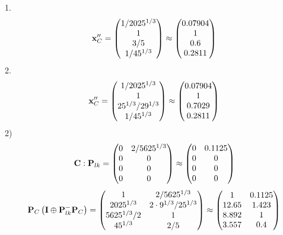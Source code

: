 \documentclass[10pt,a4paper]{article}
\begin{document}
	1.
	\[
		\bold{x}''_{C} = 
		\begin{pmatrix}
			{1} / {{2025^ {1 / 3}}} \\
			{1}{} \\
			{{3}} / {{5}} \\
			{1} / {{45^ {1 / 3}}} \\
		\end{pmatrix}
		\approx
		\begin{pmatrix}
			0.07904  \\
			1        \\
			0.6      \\
			0.2811   \\
		\end{pmatrix}
	\]
	2.
	\[
		\bold{x}''_{C} = 
		\begin{pmatrix}
			{1} / {{2025^ {1 / 3}}} \\
			{1}{} \\
			{{25^ {1 / 3}}} / {{2}{9^ {1 / 3}}} \\
			{1} / {{45^ {1 / 3}}} \\
		\end{pmatrix}
		\approx
		\begin{pmatrix}
			0.07904  \\
			1        \\
			0.7029   \\
			0.2811   \\
		\end{pmatrix}
	\]
	2)
	\[
		\bold{C}: \bold{P}_{lk} = 
		\begin{pmatrix}
			{{0}}{} & {{2}} / {{5625^ {1 / 3}}} \\
			{{0}}{} & {{0}}{} \\
			{{0}}{} & {{0}}{} \\
			{{0}}{} & {{0}}{} \\
		\end{pmatrix}
		\approx
		\begin{pmatrix}
			0        & 0.1125   \\
			0        & 0        \\
			0        & 0        \\
			0        & 0        \\
		\end{pmatrix}
	\]
	\[
		\bold{P}_{C}\left(\bold{I} \oplus \bold{P}_{lk}^{-}\bold{P}_{C}\right) = 
		\begin{pmatrix}
			{1}{} & {{2}} / {{5625^ {1 / 3}}} \\
			{{2025^ {1 / 3}}}{} & {{2} \cdot {9^ {1 / 3}}} / {{25^ {1 / 3}}} \\
			{{5625^ {1 / 3}}} / {{2}} & {1}{} \\
			{{45^ {1 / 3}}}{} & {{2}} / {{5}} \\
		\end{pmatrix}
		\approx
		\begin{pmatrix}
			1        & 0.1125   \\
			12.65    & 1.423    \\
			8.892    & 1        \\
			3.557    & 0.4      \\
		\end{pmatrix}
	\]
\end{document}

